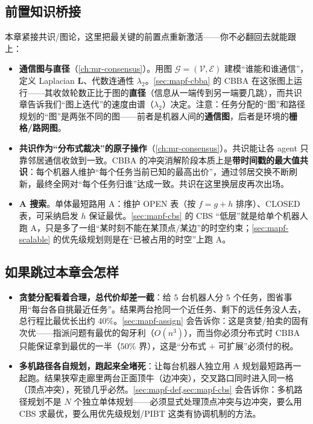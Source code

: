 \subsection*{前置知识桥接}
本章紧接共识/图论，这里把最关键的前置点重新激活——你不必翻回去就能跟上：
\begin{itemize}
  \item \textbf{通信图与直径}（\cref{ch:mr-consensus}）。用图 $\mathcal{G}=(\mathcal{V},\mathcal{E})$ 建模“谁能和谁通信”，定义 Laplacian $\mathbf{L}$、代数连通性 $\lambda_2$。\cref{sec:mapf-cbba} 的 CBBA 在这张图上运行——其收敛轮数正比于图的\textbf{直径}（信息从一端传到另一端要几跳），而共识章告诉我们“图上迭代”的速度由谱（$\lambda_2$）决定。注意：任务分配的“图”和路径规划的“图”是两张不同的图——前者是机器人间的\textbf{通信图}，后者是环境的\textbf{栅格/路网图}。
  \item \textbf{共识作为“分布式裁决”的原子操作}（\cref{ch:mr-consensus}）。共识能让各 agent 只靠邻居通信收敛到一致。CBBA 的冲突消解阶段本质上是\textbf{带时间戳的最大值共识}：每个机器人维护“每个任务当前已知的最高出价”，通过邻居交换不断刷新，最终全网对“每个任务归谁”达成一致。共识在这里换层皮再次出场。
  \item \textbf{A\* 搜索}。单体最短路用 A\*：维护 OPEN 表（按 $f=g+h$ 排序）、CLOSED 表，可采纳启发 $h$ 保证最优。\cref{sec:mapf-cbs} 的 CBS “低层”就是给单个机器人跑 A\*，只是多了一组“某时刻不能在某顶点/某边”的时空约束；\cref{sec:mapf-scalable} 的优先级规划则是在“已被占用的时空”上跑 A\*。
\end{itemize}

\subsection*{如果跳过本章会怎样}
\begin{itemize}
  \item \textbf{贪婪分配看着合理，总代价却差一截}：给 $5$ 台机器人分 $5$ 个任务，图省事用“每台各自挑最近任务”。结果两台抢同一个近任务、剩下的远任务没人去，总行程比最优长出约 $40\%$。\cref{sec:mapf-assign} 会告诉你：这是贪婪/拍卖的固有次优——指派问题有最优的匈牙利（$O(n^3)$），而当你必须分布式时 CBBA 只能保证拿到最优的一半（$50\%$ 界），这是“分布式 $+$ 可扩展”必须付的税。
  \item \textbf{多机路径各自规划，跑起来全堵死}：让每台机器人独立用 A\* 规划最短路再一起跑。结果狭窄走廊里两台正面顶牛（边冲突），交叉路口同时进入同一格（顶点冲突），死锁几乎必然。\cref{sec:mapf-def,sec:mapf-cbs} 会告诉你：多机路径规划不是 $N$ 个独立单体规划——必须显式处理顶点冲突与边冲突，要么用 CBS 求最优，要么用优先级规划/PIBT 这类有协调机制的方法。
\end{itemize}

